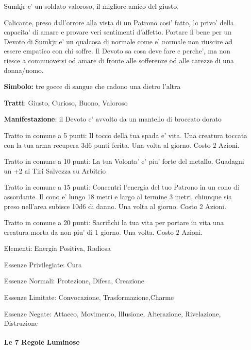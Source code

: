 \documentclass[a4paper,11pt,twoside,openany]{book}
\begin{document}
{Sumkjr e' un soldato valoroso, il migliore amico del giusto.

Calicante, preso dall'orrore alla vista di un Patrono cosi' fatto, lo privo' della capacita' di amare e provare veri sentimenti d'affetto. Portare il bene per un Devoto di Sumkjr e' un qualcosa di normale come e' normale non riuscire ad essere empatico con chi soffre. Il Devoto sa cosa deve fare e perche', ma non riesce a commuoversi od amare di fronte alle sofferenze od alle carezze di una donna/uomo.

\textbf{Simbolo:} tre gocce di sangue che cadono una dietro l'altra

\textbf{Tratti}: Giusto, Curioso, Buono, Valoroso

\textbf{Manifestazione}: il Devoto e' avvolto da un mantello di broccato dorato

\bigskip

Tratto in comune a 5 punti: Il tocco della tua spada e’ vita. Una creatura toccata con la tua arma recupera 3d6 punti ferita. Una volta al giorno. Costo 2 Azioni. 

Tratto in comune a 10 punti: La tua Volonta’ e’ piu’ forte del metallo. Guadagni un +2 ai Tiri Salvezza su Arbitrio

Tratto in comune a 15 punti: Concentri l’energia del tuo Patrono in un cono di assordante. Il cono e’ lungo 18 metri e largo al termine 3 metri, chiunque sia preso nell’area subisce 10d6 di danno. 
Una volta al giorno. Costo 2 Azioni.

Tratto in comune a 20 punti: Sacrifichi la tua vita per portare in vita una creatura morta da non piu’ di 1 giorno. Una volta. Costo 2 Azioni.

\bigskip

Elementi: Energia Positiva, Radiosa

\bigskip

Essenze Privilegiate: Cura

Essenze Normali: Protezione, Difesa, Creazione

Essenze Limitate: Convocazione, Trasformazione,Charme

Essenze Negate: Attacco, Movimento, Illusione, Alterazione, Rivelazione, Distruzione

\bigskip

\paragraph{Le 7 Regole Luminose}

}
\end{document}

